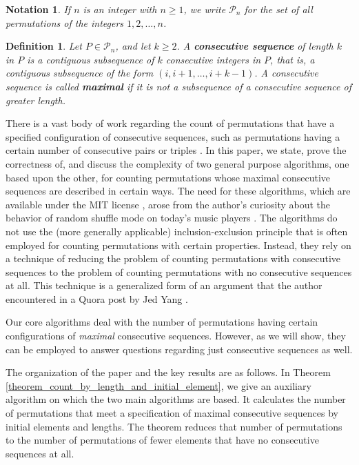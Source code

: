 \documentclass{article}
\newtheorem{definition}[theorem]{Definition}
\newtheorem{notation}[theorem]{Notation}
\begin{document}
\begin{notation}
  If $n$ is an integer with $n \geq 1$, we write ${\mathcal P}_n$ for the set of all permutations of the integers
  $1, 2, \ldots, n$.
\end{notation}

\begin{definition}
  Let $P\in {\mathcal P}_n$, and let $k \geq 2$.
  A {\bf consecutive sequence} of length $k$ in $P$ is a contiguous subsequence of $k$ consecutive
  integers in $P$, that is, a contiguous subsequence of the form $(i, i+1, \ldots, i+k-1)$.
  A consecutive sequence is called {\bf maximal} if it is not a subsequence of a consecutive sequence
  of greater length.
\end{definition}

There is a vast body of work regarding the count of permutations that have a specified configuration of
consecutive sequences, such as permutations having a certain number of consecutive pairs or triples
\cite{OeisRefs}. In this paper, we state, prove the correctness of, and discuss the complexity of two general
purpose algorithms, one based upon the other, for
counting permutations whose maximal consecutive sequences are described in certain ways. The need
for these algorithms, which are available under the MIT license \cite{Algos}, arose from the author's curiosity
about the behavior of random shuffle mode on today's music players \cite{BlogPost}. The algorithms do not
use the (more generally applicable) inclusion-exclusion principle that is often employed for counting
permutations with certain properties. Instead, they rely on a technique of reducing the problem of counting
permutations with consecutive sequences to the problem of counting permutations with no consecutive sequences
at all. This technique is a generalized form of an argument that the author encountered in a Quora post by Jed Yang
\cite{JedYang}.

Our core algorithms deal with the number of permutations having certain configurations of
{\it maximal} consecutive sequences. However, as we will show, they can be employed to answer questions
regarding just consecutive sequences as well.

The organization of the paper and the key results are as follows. In Theorem \ref{theorem_count_by_length_and_initial_element},
we give an auxiliary algorithm on which the two main algorithms are based. It calculates the number of
permutations that meet a specification of maximal consecutive sequences by initial elements and lengths.
The theorem reduces that number of permutations to the number of permutations of fewer elements that
have no consecutive sequences at all.
\end{document}
